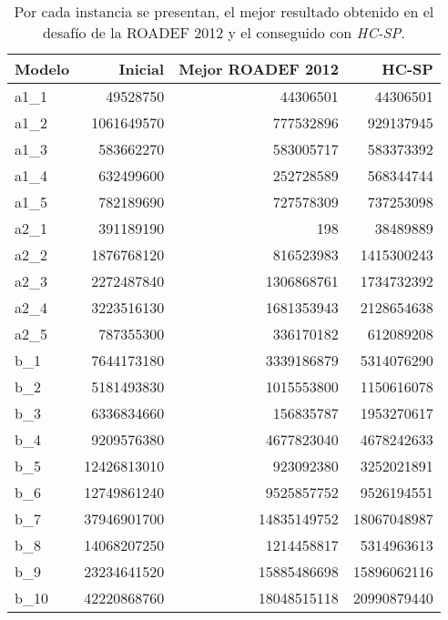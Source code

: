 \documentclass[../informe2.tex]{subfiles}
\begin{document}
\begin{table}[h]
	\small
\centering
\begin{tabular}{@{}lrrr@{}}
\toprule
Modelo & Inicial & Mejor ROADEF 2012 & HC-SP \\ \midrule
a1\_1  & 49528750               & 44306501            & 44306501              \\
a1\_2  & 1061649570             & 777532896           & 929137945             \\
a1\_3  & 583662270              & 583005717           & 583373392             \\
a1\_4  & 632499600              & 252728589           & 568344744             \\
a1\_5  & 782189690              & 727578309           & 737253098             \\
a2\_1  & 391189190              & 198                 & 38489889              \\
a2\_2  & 1876768120             & 816523983           & 1415300243            \\
a2\_3  & 2272487840             & 1306868761          & 1734732392            \\
a2\_4  & 3223516130             & 1681353943          & 2128654638            \\
a2\_5  & 787355300              & 336170182           & 612089208             \\
b\_1   & 7644173180             & 3339186879          & 5314076290            \\
b\_2   & 5181493830             & 1015553800          & 1150616078            \\
b\_3   & 6336834660             & 156835787           & 1953270617            \\
b\_4   & 9209576380             & 4677823040          & 4678242633            \\
b\_5   & 12426813010            & 923092380           & 3252021891            \\
b\_6   & 12749861240            & 9525857752          & 9526194551            \\
b\_7   & 37946901700            & 14835149752         & 18067048987           \\
b\_8   & 14068207250            & 1214458817          & 5314963613            \\
b\_9   & 23234641520            & 15885486698         & 15896062116           \\
b\_10  & 42220868760            & 18048515118         & 20990879440           \\ \bottomrule
\end{tabular}
\caption{\small Por cada instancia se presentan, el mejor resultado obtenido en el desafío de la ROADEF 2012 y el conseguido con \textit{HC-SP}.}
\label{tabla:comparative-with-best-roadef}
\end{table}



\begin{figure}[ht]
	\caption{\small}\label{fig:comparativa-hc-best-challenge}
\end{figure}
\end{document}
